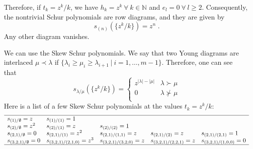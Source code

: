 Therefore, if \(t_k = z^k/k\), we have \(h_k=z^k\ \forall \ k\in
\mathbb{N}\) and \(e_l=0\ \forall \ l\geq 2 \). Consequently,
the nontrivial Schur polynomials are row diagrams,
and they are given by
\begin{equation}
  s_{(n)}  (\{z^k / k\}) = z^n\; . 
\end{equation}
Any other diagram vanishes.

We can use the Skew Schur polynomials. We say that two Young diagrams are
interlaced \(\mu \prec \lambda\) if \(\{ \lambda_i \geq \mu_i \geq \lambda_{i+1}
\ | \ i = 1, \dots, m-1\}\). Therefore, one can see that~\cite{Okounkov2001}
\begin{equation}
  \label{eq:schur:case1}
s_{\lambda/\mu}(\{z^k / k\}) =
\left\{ 
\begin{array}{ll}
z^{|\lambda| - |\mu|} & \lambda \succ \mu \\
0 & \lambda \nsucc \mu \\
\end{array}
\right.
\end{equation}
Here is a list of a few Skew Schur polynomials at the values \(t_k = z^k /k\): 
\[
\begin{array}{lllll}
  \hline
    s_{(1)/\emptyset} = z   & s_{(1)/(1)} = 1 &&&	\\
    s_{(2)/\emptyset} = z^2 & s_{(2)/(1)} = z & s_{(2)/(2)} = 1 &\\  
    s_{(2,1)/\emptyset} = 0 & s_{(2,1)/(1)} = z^2 & s_{(2,1)/(1,1)}=z  & s_{(2,1)/(2)}=z & s_{(2,1)/(2,1)}=1  \\ 
    s_{(3,2,1)/\emptyset} = 0 & s_{(3,2,1)/(2,1,0)} = z^3 & s_{(3,2,1)/(3,2,0)}=z & s_{(3,2,1)/(2,2,1)}= z &
    s_{(3,2,1)/(1,0,0)}=0 \\ 
  \hline
\end{array}
\]


